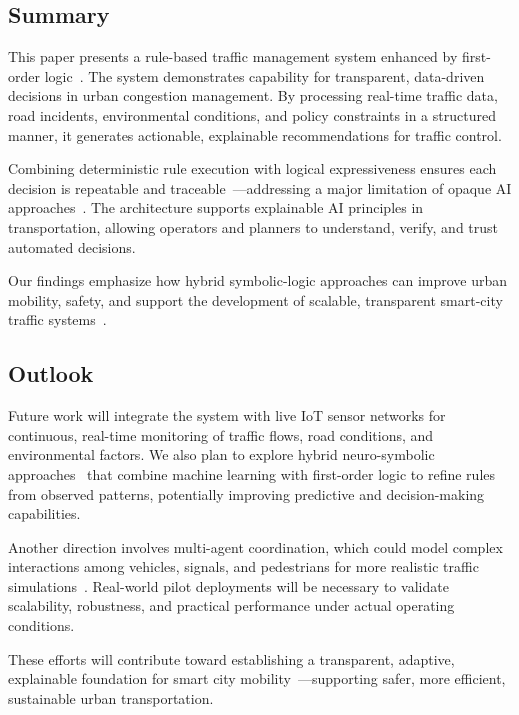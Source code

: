 \documentclass{article}
\begin{document}
\subsection{Summary}
This paper presents a rule-based traffic management system enhanced by first-order logic~\cite{xu_consistency_2006, spillo_neuro_symbolic_2024}. The system demonstrates capability for transparent, data-driven decisions in urban congestion management. By processing real-time traffic data, road incidents, environmental conditions, and policy constraints in a structured manner, it generates actionable, explainable recommendations for traffic control.

Combining deterministic rule execution with logical expressiveness ensures each decision is repeatable and traceable~\cite{karagiannis_wissensmanagement_2001}—addressing a major limitation of opaque AI approaches~\cite{russell_ai_2009}. The architecture supports explainable AI principles in transportation, allowing operators and planners to understand, verify, and trust automated decisions.

Our findings emphasize how hybrid symbolic-logic approaches can improve urban mobility, safety, and support the development of scalable, transparent smart-city traffic systems~\cite{jiang_spatiotemporal_2017, epj_scaling_2024, karagiannis_domain_2016}.

\subsection{Outlook}
Future work will integrate the system with live IoT sensor networks for continuous, real-time monitoring of traffic flows, road conditions, and environmental factors. We also plan to explore hybrid neuro-symbolic approaches~\cite{spillo_neuro_symbolic_2024} that combine machine learning with first-order logic to refine rules from observed patterns, potentially improving predictive and decision-making capabilities.

Another direction involves multi-agent coordination, which could model complex interactions among vehicles, signals, and pedestrians for more realistic traffic simulations~\cite{russell_ai_2009}. Real-world pilot deployments will be necessary to validate scalability, robustness, and practical performance under actual operating conditions.

These efforts will contribute toward establishing a transparent, adaptive, explainable foundation for smart city mobility~\cite{karagiannis_domain_2016}—supporting safer, more efficient, sustainable urban transportation.



\end{document}
